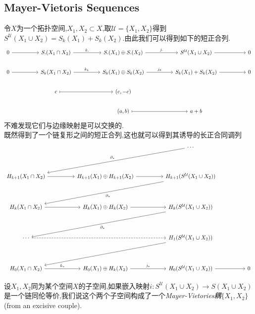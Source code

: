 \documentclass{article}
\begin{document}
\subsection{Mayer-Vietoris Sequences}
令$X$为一个拓扑空间,$X_1,X_2 \subset X$,取$\mathcal{U}=\{X_1,X_2\}$得到$S^\mathcal{U}(X_1\cup X_2) = S_k(X_1)+S_k(X_2)$.由此我们可以得到如下的短正合列.
\[\begin{tikzcd}
	0 && {S.(X_1\cap X_2)} && {S.(X_1)\oplus S.(X_2)} && {S^\mathcal{U}(X_1\cup X_2)} && 0 \\
	0 && {S_k(X_1\cap X_2)} && {S_k(X_1)\oplus S_k(X_2)} && {S_k(X_1)+S_k(X_2)} && 0 \\
	&& c && {(c,-c)} \\
	&&&& {(a,b)} && {a+b}
	\arrow[from=1-1, to=1-3]
	\arrow["{k.}", from=1-3, to=1-5]
	\arrow["{j.}", from=1-5, to=1-7]
	\arrow[from=1-7, to=1-9]
	\arrow["{k_k}", from=2-3, to=2-5]
	\arrow["{j_k}", from=2-5, to=2-7]
	\arrow[from=2-7, to=2-9]
	\arrow[from=2-1, to=2-3]
	\arrow[maps to, from=3-3, to=3-5]
	\arrow[maps to, from=4-5, to=4-7]
\end{tikzcd}\]
不难发现它们与边缘映射是可以交换的.\\
既然得到了一个链复形之间的短正合列,这也就可以得到其诱导的长正合同调列
\[\begin{tikzcd}
	&&&& \cdots \\
	\\
	{H_{k+1}(X_1\cap X_2)} && {H_{k+1}(X_1)\oplus H_{k+1}(X_2)} && {H_{k+1}(S^\mathcal{U}(X_1\cup X_2))} \\
	\\
	{H_{k}(X_1\cap X_2)} && {H_{k}(X_1)\oplus H_k(X_2)} && {H_k(S^\mathcal{U}(X_1\cup X_2))} \\
	\\
	\cdots &&&& {H_1(S^\mathcal{U}(X_1\cup X_2))} \\
	\\
	{H_0(X_1\cap X_2)} && {H_{0}(X_1)\oplus H_k(X_2)} && {H_0(S^\mathcal{U}(X_1\cup X_2))} && 0
	\arrow["{\partial_*}", from=3-5, to=5-1]
	\arrow[from=3-1, to=3-3]
	\arrow[from=3-3, to=3-5]
	\arrow[from=5-1, to=5-3]
	\arrow[from=5-3, to=5-5]
	\arrow["{\partial_*}"', from=1-5, to=3-1]
	\arrow["{\partial_*}", from=5-5, to=7-1]
	\arrow[dashed, from=7-1, to=7-5]
	\arrow[from=7-5, to=9-1]
	\arrow["{k_*}", from=9-1, to=9-3]
	\arrow["{j_*}", from=9-3, to=9-5]
	\arrow[from=9-5, to=9-7]
\end{tikzcd}\]
\begin{definition}
    设$X_1,X_2$同为某个空间$X$的子空间,如果嵌入映射$i: S^\mathcal{U} (X_1 \cup X_2) \to S(X_1 \cup X_2)$是一个链同伦等价,我们说这个两个子空间构成了一个\emph{Mayer-Vietories耦}$\{X_1,X_2\}$(from an excisive couple).
\end{definition}
\end{document}
